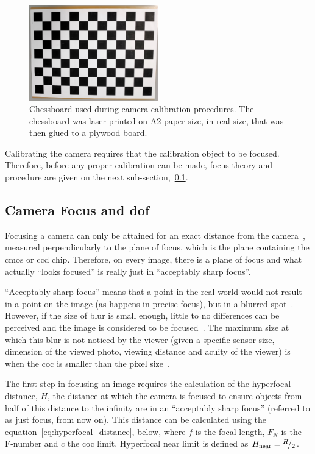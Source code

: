 \begin{figure}[H]
	\centering
	\includegraphics[width=0.5\textwidth]{img/experimental-setup/chessboard.jpg}
	\caption{Chessboard used during camera calibration procedures. The chessboard was laser printed on A2 paper size, in real size, that was then glued to a plywood board.}
	\label{fig:chessboard}
\end{figure}

Calibrating the camera requires that the calibration object to be focused. Therefore, before any proper calibration can be made, focus theory and procedure are given on the next sub-section,~\ref{subsec:calibration:camera-focus}.


\subsection{Camera Focus and \acl{dof}}
\label{subsec:calibration:camera-focus}
Focusing a camera can only be attained for an exact distance from the camera~\cite{Merklinger1993, Photopillers}, measured perpendicularly to the plane of focus, which is the plane containing the \ac{cmos} or \ac{ccd} chip. Therefore, on every image, there is a plane of focus and what actually ``looks focused'' is really just in ``acceptably sharp focus''.

``Acceptably sharp focus'' means that a point in the real world would not result in a point on the image (as happens in precise focus), but in a blurred spot~\cite{Photopillers}. However, if the size of blur is small enough, little to no differences can be perceived and the image is considered to be focused~\cite{Photopillers}. The maximum size at which this blur is not noticed by the viewer (given a specific sensor size, dimension of the viewed photo, viewing distance and acuity of the viewer) is when the \ac{coc} is smaller than the pixel size~\cite{Photopillers, Merklinger1993}.

The first step in focusing an image requires the calculation of the hyperfocal distance, $H$, the distance at which the camera is focused to ensure objects from half of this distance to the infinity are in an ``acceptably sharp focus'' (referred to as just focus, from now on). This distance can be calculated using the equation~\ref{eq:hyperfocal_distance}, below, where $f$ is the focal length, $F_N$ is the F-number and $c$ the \ac{coc} limit. Hyperfocal near limit is defined as $H_\text{near} = {}^{H}\!/_{2}$.

